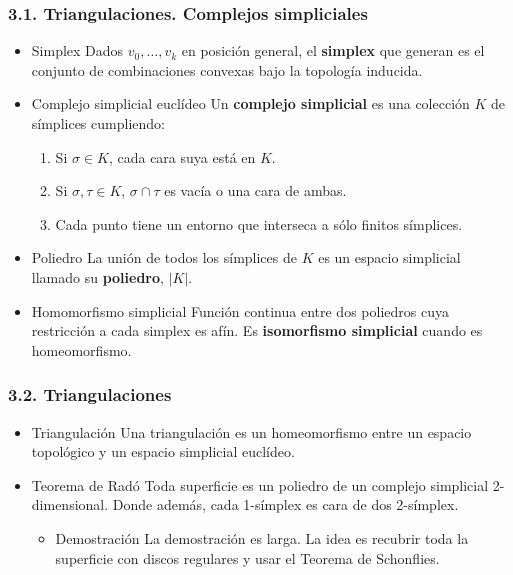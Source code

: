 \documentclass[11pt]{article}
\begin{document}
\subsubsection*{3.1. Triangulaciones. Complejos simpliciales}
\label{sec-1-4-3}
\begin{itemize}
\item Simplex
\label{sec-1-4-3-1}
Dados $v_0,\dots,v_k$ en posición general, el \textbf{simplex} que generan es el
conjunto de combinaciones convexas bajo la topología inducida.

\item Complejo simplicial euclídeo
\label{sec-1-4-3-2}
Un \textbf{complejo simplicial} es una colección $K$ de símplices cumpliendo:

\begin{enumerate}
\item Si $\sigma \in K$, cada cara suya está en $K$.
\item Si $\sigma,\tau \in K$, $\sigma \cap \tau$ es vacía o una cara de ambas.
\item Cada punto tiene un entorno que interseca a sólo finitos símplices.
\end{enumerate}

\item Poliedro
\label{sec-1-4-3-3}
La unión de todos los símplices de $K$ es un espacio simplicial llamado
su \textbf{poliedro}, $|K|$.

\item Homomorfismo simplicial
\label{sec-1-4-3-4}
Función continua entre dos poliedros cuya restricción a cada simplex
es afín. Es \textbf{isomorfismo simplicial} cuando es homeomorfismo.
\end{itemize}

\subsubsection*{3.2. Triangulaciones}
\label{sec-1-4-4}
\begin{itemize}
\item Triangulación
\label{sec-1-4-4-1}
Una triangulación es un homeomorfismo entre un espacio topológico
y un espacio simplicial euclídeo.

\item Teorema de Radó
\label{sec-1-4-4-2}
Toda superficie es un poliedro de un complejo simplicial 2-dimensional.
Donde además, cada 1-símplex es cara de dos 2-símplex.

\begin{itemize}
\item Demostración
\label{sec-1-4-4-2-1}
La demostración es larga. La idea es recubrir toda la superficie con
discos regulares y usar el Teorema de Schonflies.
\end{itemize}
\end{itemize}
\end{document}
